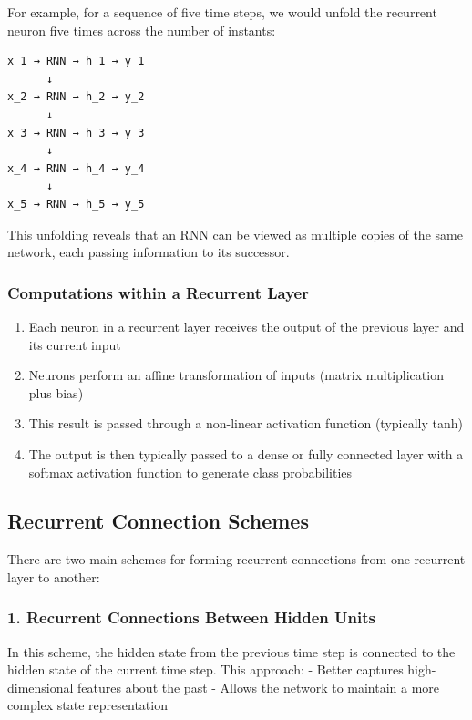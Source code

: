 \documentclass[
  letterpaper,
  DIV=11,
  numbers=noendperiod]{scrreprt}
\providecommand{\tightlist}{%
  \setlength{\itemsep}{0pt}\setlength{\parskip}{0pt}}\usepackage{longtable,booktabs,array}
\begin{document}
For example, for a sequence of five time steps, we would unfold the
recurrent neuron five times across the number of instants:

\begin{verbatim}
x_1 → RNN → h_1 → y_1
      ↓
x_2 → RNN → h_2 → y_2
      ↓
x_3 → RNN → h_3 → y_3
      ↓
x_4 → RNN → h_4 → y_4
      ↓
x_5 → RNN → h_5 → y_5
\end{verbatim}

This unfolding reveals that an RNN can be viewed as multiple copies of
the same network, each passing information to its successor.

\subsubsection{Computations within a Recurrent
Layer}\label{computations-within-a-recurrent-layer}

\begin{enumerate}
\def\labelenumi{\arabic{enumi}.}
\tightlist
\item
  Each neuron in a recurrent layer receives the output of the previous
  layer and its current input
\item
  Neurons perform an affine transformation of inputs (matrix
  multiplication plus bias)
\item
  This result is passed through a non-linear activation function
  (typically tanh)
\item
  The output is then typically passed to a dense or fully connected
  layer with a softmax activation function to generate class
  probabilities
\end{enumerate}

\subsection{Recurrent Connection
Schemes}\label{recurrent-connection-schemes}

There are two main schemes for forming recurrent connections from one
recurrent layer to another:

\subsubsection{1. Recurrent Connections Between Hidden
Units}\label{recurrent-connections-between-hidden-units}

In this scheme, the hidden state from the previous time step is
connected to the hidden state of the current time step. This approach: -
Better captures high-dimensional features about the past - Allows the
network to maintain a more complex state representation
\end{document}
